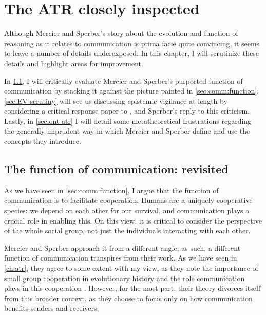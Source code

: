 \chapter{The ATR closely inspected}
\label{ch:scrutiny}

Although Mercier and Sperber's story about the evolution and function of reasoning as it relates to communication is prima facie quite convincing, it seems to leave a number of details underexposed. In this chapter, I will scrutinize these details and highlight areas for improvement.

In \cref{sec:comm-func-scrutiny}, I will critically evaluate Mercier and Sperber's purported function of communication by stacking it against the picture painted in \cref{sec:comm:function}.
\cref{sec:EV-scrutiny} will see us discussing epistemic vigilance at length by considering a critical response paper to \citet{Sperber10}, and Sperber's reply to this criticism.
Lastly, in \cref{sec:ont-atr} I will detail some metatheoretical frustrations regarding the generally imprudent way in which Mercier and Sperber define and use the concepts they introduce.

\section{The function of communication: revisited}
\label{sec:comm-func-scrutiny}

As we have seen in \cref{sec:comm:function}, I argue that the function of communication is to facilitate cooperation. Humans are a uniquely cooperative species: we depend on each other for our survival, and communication plays a crucial role in enabling this. On this view, it is critical to consider the perspective of the whole social group, not just the individuals interacting with each other.

Mercier and Sperber approach it from a different angle; as such, a different function of communication transpires from their work.
As we have seen in \cref{ch:atr}, they agree to some extent with my view, as they note the importance of small group cooperation in evolutionary history and the role communication plays in this cooperation \citep[p.~60]{MS11}.
However, for the most part, their theory divorces itself from this broader context, as they choose to focus only on how communication benefits senders and receivers.

